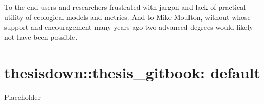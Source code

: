 \documentclass[12pt,twoside,openany]{reedthesis}
\begin{document}
  \begin{dedication}
    To the end-users and researchers frustrated with jargon and lack of
    practical utility of ecological models and metrics. And to Mike Moulton,
    without whose support and encouragement many years ago two advanced
    degrees would likely not have been possible.
  \end{dedication}
\mainmatter %
\pagestyle{fancyplain} %
\doublespacing{} %

\chapter{thesisdown::thesis\_gitbook:
default}\label{thesisdownthesis_gitbook-default}

Placeholder
\end{document}
